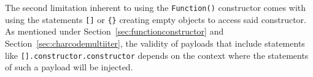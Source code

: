 The second limitation inherent to using the \verb|Function()| constructor comes with using the statements \verb|[]| or \verb|{}| creating empty objects to access said constructor. As mentioned under Section~\ref{sec:functionconstructor} and Section~\ref{sec:charcodemultiiter}, the validity of payloads that include statements like \verb|[].constructor.constructor| depends on the context where the statements of such a payload will be injected. 


